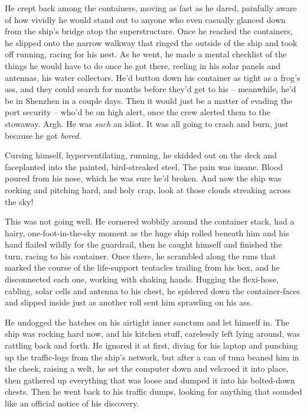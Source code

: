 He crept back among the containers, moving as fast as he dared,
painfully aware of how vividly he would stand out to anyone who
even casually glanced down from the ship's bridge atop the
superstructure. Once he reached the containers, he slipped onto the
narrow walkway that ringed the outside of the ship and took off
running, racing for his nest. As he went, he made a mental
checklist of the things he would have to do once he got there,
reeling in his solar panels and antennas, his water collectors.
He'd button down his container as tight as a frog's ass, and they
could search for months before they'd get to his -- meanwhile, he'd
be in Shenzhen in a couple days. Then it would just be a matter of
evading the port security -- who'd be on high alert, once the crew
alerted them to the stowaway. Argh. He was \emph{such} an idiot. It
was all going to crash and burn, just because he got \emph{bored}.

Cursing himself, hyperventilating, running, he skidded out on the
deck and faceplanted into the painted, bird-streaked steel. The
pain was insane. Blood poured from his nose, which he was sure he'd
broken. And now the ship was rocking and pitching hard, and holy
crap, look at those clouds streaking across the sky!

This was not going well. He cornered wobbily around the container
stack, had a hairy, one-foot-in-the-sky moment as the huge ship
rolled beneath him and his hand flailed wildly for the guardrail,
then he caught himself and finished the turn, racing to his
container. Once there, he scrambled along the runs that marked the
course of the life-support tentacles trailing from his box, and he
disconnected each one, working with shaking hands. Hugging the
flexi-hose, cabling, solar cells and antenna to his chest, he
spidered down the container-faces and slipped inside just as
another roll sent him sprawling on his ass.

He undogged the hatches on his airtight inner sanctum and let
himself in. The ship was rocking hard now, and his kitchen stuff,
carelessly left lying around, was rattling back and forth. He
ignored it at first, diving for his laptop and punching up the
traffic-logs from the ship's network, but after a can of tuna
beaned him in the cheek, raising a welt, he set the computer down
and velcroed it into place, then gathered up everything that was
loose and dumped it into his bolted-down chests. Then he went back
to his traffic dumps, looking for anything that sounded like an
official notice of his discovery.

